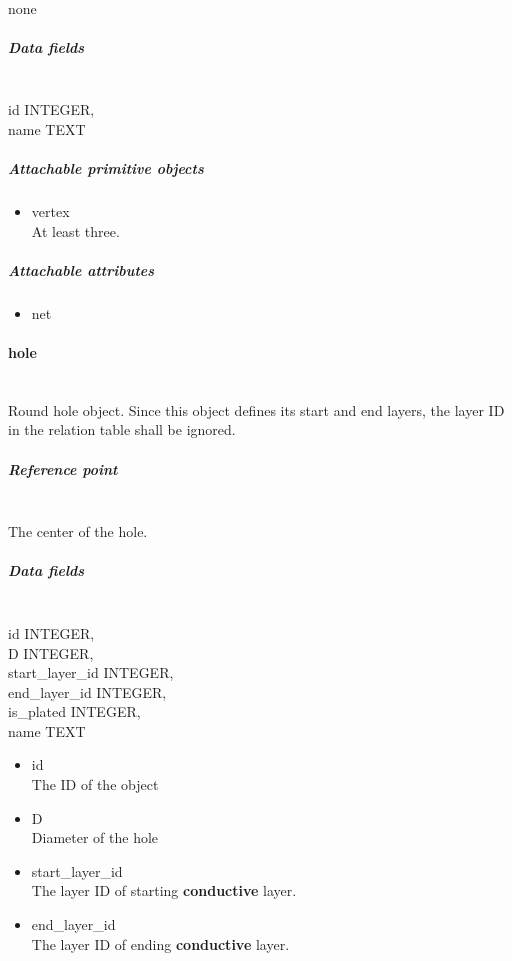 \documentclass[12pt]{article}
\begin{document}
\mbox{}\\

none

\subparagraph{Data fields}\label{data-fields-4}

\mbox{}\\

id INTEGER,\\
name TEXT

\subparagraph{Attachable primitive
objects}\label{attachable-primitive-objects-4}

\begin{itemize}
\item
  vertex\\
At least three.
\end{itemize}

\subparagraph{Attachable attributes}\label{attachable-attributes-4}

\begin{itemize}
\item
  net
\end{itemize}

\paragraph{hole}\label{hole}

\mbox{}\\

Round hole object. Since this object defines its start and end layers,
the layer ID in the relation table shall be ignored.

\subparagraph{Reference point}\label{reference-point-5}

\mbox{}\\

The center of the hole.

\subparagraph{Data fields}\label{data-fields-5}

\mbox{}\\

id INTEGER,\\
D INTEGER,\\
start\_layer\_id INTEGER,\\
end\_layer\_id INTEGER,\\
is\_plated INTEGER,\\
name TEXT

\begin{itemize}
\item
  id\\
The ID of the object
\item
  D\\
Diameter of the hole
\item
  start\_layer\_id\\
The layer ID of starting \textbf{conductive} layer.
\item
  end\_layer\_id\\
The layer ID of ending \textbf{conductive} layer.
\end{itemize}
\end{document}
